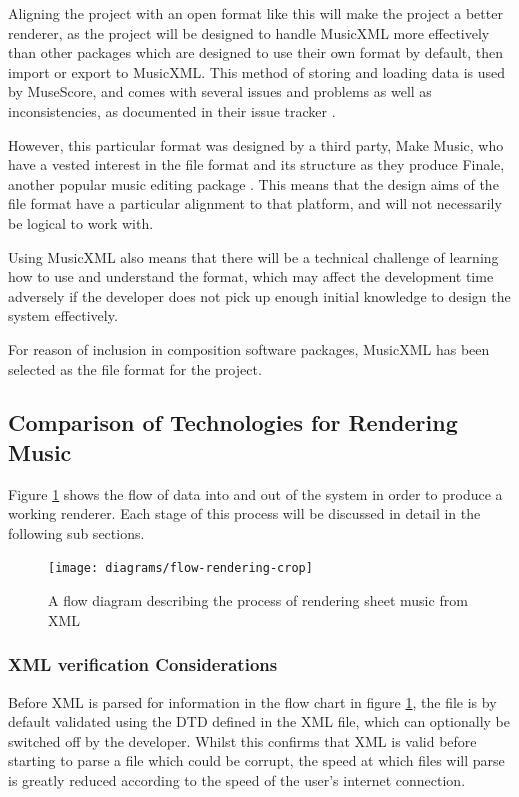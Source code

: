 Aligning the project with an open format like this will make the project a better renderer, as the project will be designed to handle MusicXML more effectively than other packages which are designed to use their own format by default, then import or export to MusicXML. This method of storing and loading data is used by MuseScore, and comes with several issues and problems as well as inconsistencies, as documented in their issue tracker \parencite{mscoreBugTracker}.

However, this particular format was designed by a third party, Make Music, who have a vested interest in the file format and its structure as they produce Finale, another popular music editing package \parencite{mxmlSoft}. This means that the design aims of the file format have a particular alignment to that platform, and will not necessarily be logical to work with.

Using MusicXML also means that there will be a technical challenge of learning how to use and understand the format, which may affect the development time adversely if the developer does not pick up enough initial knowledge to design the system effectively.

For reason of inclusion in composition software packages, MusicXML has been selected as the file format for the project. 

\subsection{Comparison of Technologies for Rendering Music}
Figure \ref{fig:flow} shows the flow of data into and out of the system in order to produce a working renderer. Each stage of this process will be discussed in detail in the following sub sections.

\begin{figure}[H]
	\centering
	\texttt{[image: diagrams/flow-rendering-crop]}
	
	\caption{A flow diagram describing the process of rendering sheet music from XML}	
	\label{fig:flow}
\end{figure}

\subsubsection{XML verification Considerations}
Before XML is parsed for information in the flow chart in figure \ref{fig:flow}, the file is by default validated using the DTD defined in the XML file, which can optionally be switched off by the developer. Whilst this confirms that XML is valid before starting to parse a file which could be corrupt, the speed at which files will parse is greatly reduced according to the speed of the user's internet connection.

